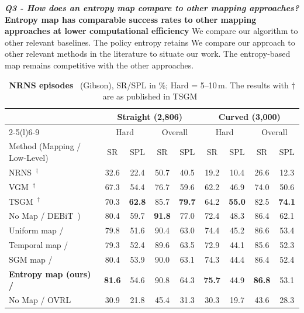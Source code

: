\textit{\textbf{Q3 -  How does an entropy map compare to other mapping approaches?}}
\textbf{Entropy map has comparable success rates to other mapping approaches at lower computational efficiency}
We compare our algorithm to other relevant baselines.
The  policy entropy retains
We compare our approach to other relevant methods in the literature to situate our work. The entropy-based map remains competitive with the other approaches.
\begin{table}[H]
\centering
\scriptsize
\setlength{\tabcolsep}{3pt}
\caption{\textbf{NRNS episodes}~\cite{hahn2021no} (Gibson), SR/SPL in \%; Hard = 5--10\,m. The results with $\dagger$ are as published in TSGM~\cite{kim2023topological}}
\label{tab:nrns}
\begin{tabular}{@{}l cc cc cc cc@{}}
\toprule
& \multicolumn{4}{c}{Straight (2{,}806)} & \multicolumn{4}{c}{Curved (3{,}000)} \\
\cmidrule(lr){2-5}\cmidrule(l){6-9}
& \multicolumn{2}{c}{Hard} & \multicolumn{2}{c}{Overall} & \multicolumn{2}{c}{Hard} & \multicolumn{2}{c}{Overall} \\
Method (Mapping / Low-Level) & SR & SPL & SR & SPL & SR & SPL & SR & SPL \\
\midrule
NRNS~\cite{hahn2021no}$^\dagger$         & 32.6 & 22.4 & 50.7 & 40.5 & 19.2 & 10.4 & 26.6 & 12.3 \\
VGM~\cite{kwon2021visual}$^\dagger$     & 67.3 & 54.4 & 76.7 & 59.6 & 62.2 & 46.9 & 74.0 & 50.6 \\
TSGM~\cite{kim2023topological}$^\dagger$ & 70.3 & \textbf{62.8} & 85.7 & \textbf{79.7} & 64.2 & \textbf{55.0} & 82.5 & \textbf{74.1} \\
No Map / DEBiT~\cite{bono2024end})             & 80.4 & 59.7 & \textbf{91.8} & 77.0 & 72.4 & 48.3 & 86.4 & 62.1 \\
 \midrule
 Uniform map /~\cite{bono2024end}           & 79.8 & 51.6 & 90.4 & 63.0 & 74.4 & 45.2 & 86.6 & 53.4 \\
\midrule
Temporal map / ~\cite{bono2024end}         & 79.3 & 52.4 & 89.6 & 63.5 & 72.9 & 44.1 & 85.6 & 52.3 \\
SGM map / ~\cite{bono2024end}                & 80.4 & 53.9 & 90.0 & 63.1 & 74.3 & 44.4 & 86.4 & 52.4 \\
\textbf{Entropy map (ours) / ~\cite{bono2024end}}    & \textbf{81.6} & 54.6 & 90.8 & 64.3 & \textbf{75.7} & 44.9 & \textbf{86.8} & 53.1 \\
\midrule
No Map / OVRL~\cite{yadav2023offline}      & 30.9 & 21.8 & 45.4 & 31.3 & 30.3 & 19.7 & 43.6 & 28.3 \\
\midrule


\end{tabular}
\end{table}

